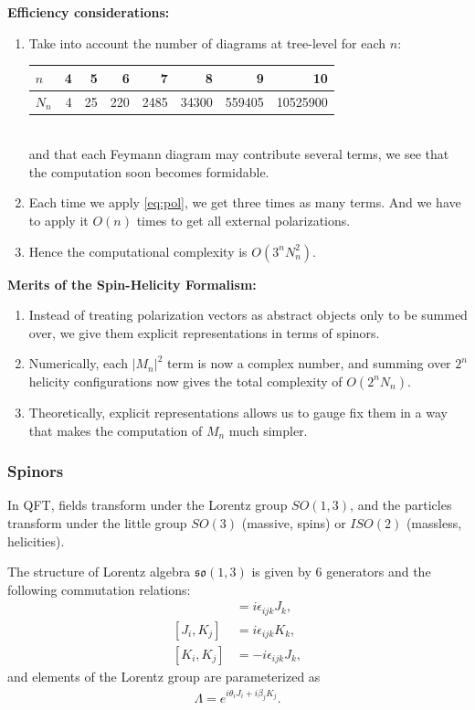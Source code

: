 \textbf{Efficiency considerations:}
\begin{enumerate}
    \item 
Take into account the number of diagrams at tree-level for each $n$:

\begin{tabular}{l|rrrrrrr}
$n$ & 4 & 5 & 6 & 7 & 8 & 9 & 10 \\
\hline $N_n$ & 4 & 25 & 220 & 2485 & 34300 & 559405 & 10525900
\end{tabular}\\
and that each Feymann diagram may contribute several terms, we see that the computation soon becomes formidable.

\item Each time we apply \eqref{eq:pol}, we get three times as many terms. And we have to apply it $O(n)$ times to get all external polarizations.

\item Hence the computational complexity is $O(3^n N_n^2)$.

\end{enumerate}

\textbf{Merits of the Spin-Helicity Formalism:}

\begin{enumerate}
    \item Instead of treating polarization vectors as abstract objects only to be summed over, we give them explicit representations in terms of spinors. 
    \item Numerically, each $|M_n|^2$ term is now a complex number, and summing over $2^n$ helicity configurations now gives the total complexity of $O(2^n N_n)$.
    \item Theoretically, explicit representations allows us to gauge fix them in a way that makes the computation of $M_n$ much simpler.
\end{enumerate}

\subsubsection{Spinors}

In QFT, fields transform under the Lorentz group $SO(1,3)$, and the particles transform under the little group $SO(3)$ (massive, spins) or $ISO(2)$ (massless, helicities).

The structure of Lorentz algebra $\mathfrak{so}(1,3)$ is given by $6$ generators and the following commutation relations:
\begin{align*}
    [J_i, J_j] &= i \epsilon_{ijk} J_k, \\
    [J_i, K_j] &= i \epsilon_{ijk} K_k, \\
    [K_i, K_j] &= -i \epsilon_{ijk} J_k,
\end{align*}
and elements of the Lorentz group are parameterized as
\begin{align}
    \Lambda = e^{i \theta_i J_i + i \beta_j K_j}.
\end{align}

